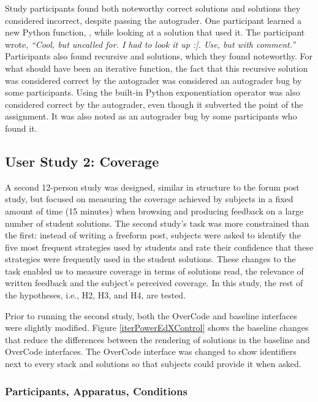 Study participants found both noteworthy correct solutions and solutions they considered incorrect, despite passing the autograder. One participant learned a new Python function, , while looking at a solution that used it. The participant wrote, \textit{``Cool, but uncalled for. I had to look it up :]. Use, but with comment.''} Participants also found recursive  and  solutions, which they found noteworthy. For what should have been an iterative  function, the fact that this recursive solution was considered correct by the autograder was considered an autograder bug by some participants. Using the built-in Python exponentiation operator \codevar{**} was also considered correct by the autograder, even though it subverted the point of the assignment. It was also noted as an autograder bug by some participants who found it.

\subsection{User Study 2: Coverage}

A second 12-person study was designed, similar in structure to the forum post study, but focused on measuring the coverage achieved by subjects in a fixed amount of time (15 minutes) when browsing and producing feedback on a large number of student solutions. The second study's task was more constrained than the first: instead of writing a freeform post, subjects were asked to identify the five most frequent strategies used by students and rate their confidence that these strategies were frequently used in the student solutions. These changes to the task enabled us to measure coverage in terms of solutions read, the relevance of written feedback and the subject's perceived coverage. In this study, the rest of the hypotheses, i.e., H2, H3, and H4, are tested.

Prior to running the second study, both the OverCode and baseline interfaces were slightly modified. Figure \ref{iterPowerEdXControl} shows the baseline changes that reduce the differences between the rendering of solutions in the baseline and OverCode interfaces. The OverCode interface was changed to show identifiers next to every stack and solutions so that subjects could provide it when asked.

\subsubsection{Participants, Apparatus, Conditions}

